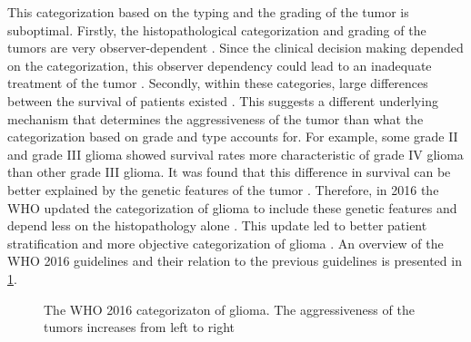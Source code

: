 This categorization based on the typing and the grading of the \gls{tumor} is suboptimal.
Firstly, the histopathological categorization and grading of the \glspl{tumor} are very observer-dependent \autocite{mittler1996gradingreliability, vandenbent2010interobserver}.
Since the clinical decision making depended on the categorization, this observer dependency could lead to an inadequate treatment of the \gls{tumor} \autocite{vandenbent2010interobserver}.
Secondly, within these categories, large differences between the survival of patients existed  \autocite{dubbink2015molecular}.
This suggests a different underlying mechanism that determines the aggressiveness of the \gls{tumor} than what the categorization based on grade and type accounts for.
For example, some grade II and grade III \gls{glioma} showed survival rates more characteristic of grade IV \gls{glioma} than other grade III \gls{glioma}.
It was found that this difference in survival can be better explained by the genetic features of the \gls{tumor} \autocite{dubbink2015molecular,eckel2015gliomagroups}.
Therefore, in 2016 the \gls{WHO} updated the categorization of \gls{glioma} to include these genetic features and depend less on the histopathology alone \cite{louis20162016}.
This update led to better patient stratification and more objective categorization of \gls{glioma} \autocite{molinaro2019geneticepidemiology}.
An overview of the \gls{WHO} 2016 guidelines and their relation to the previous guidelines is presented in \cref{fig:intro_glioma_categorization}.

\begin{figure}[hbt]
    \centering
    \caption{The \acrfull{WHO} 2016 categorizaton of glioma. The aggressiveness of the \glspl{tumor} increases from left to right}\label{fig:intro_glioma_categorization}
\end{figure}

